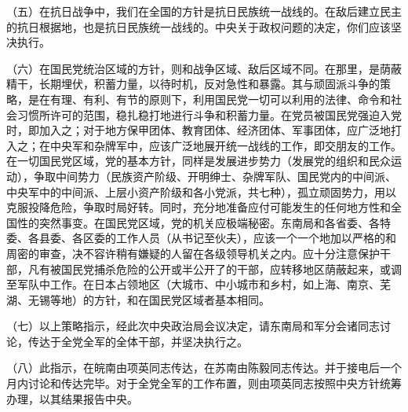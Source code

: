 （五）在抗日战争中，我们在全国的方针是抗日民族统一战线的。在敌后建立民主的抗日根据地，也是抗日民族统一战线的。中央关于政权问题的决定，你们应该坚决执行。

（六）在国民党统治区域的方针，则和战争区域、敌后区域不同。在那里，是荫蔽精干，长期埋伏，积蓄力量，以待时机，反对急性和暴露。其与顽固派斗争的策略，是在有理、有利、有节的原则下，利用国民党一切可以利用的法律、命令和社会习惯所许可的范围，稳扎稳打地进行斗争和积蓄力量。在党员被国民党强迫入党时，即加入之；对于地方保甲团体、教育团体、经济团体、军事团体，应广泛地打入之；在中央军和杂牌军中，应该广泛地展开统一战线的工作，即交朋友的工作。在一切国民党区域，党的基本方针，同样是发展进步势力（发展党的组织和民众运动），争取中间势力（民族资产阶级、开明绅士、杂牌军队、国民党内的中间派、中央军中的中间派、上层小资产阶级和各小党派，共七种），孤立顽固势力，用以克服投降危险，争取时局好转。同时，充分地准备应付可能发生的任何地方性和全国性的突然事变。在国民党区域，党的机关应极端秘密。东南局和各省委、各特委、各县委、各区委的工作人员（从书记至伙夫），应该一个一个地加以严格的和周密的审查，决不容许稍有嫌疑的人留在各级领导机关之内。应十分注意保护干部，凡有被国民党捕杀危险的公开或半公开了的干部，应转移地区荫蔽起来，或调至军队中工作。在日本占领地区（大城市、中小城市和乡村，如上海、南京、芜湖、无锡等地）的方针，和在国民党区域者基本相同。

（七）以上策略指示，经此次中央政治局会议决定，请东南局和军分会诸同志讨论，传达于全党全军的全体干部，并坚决执行之。

（八）此指示，在皖南由项英同志传达，在苏南由陈毅同志传达。并于接电后一个月内讨论和传达完毕。对于全党全军的工作布置，则由项英同志按照中央方针统筹办理，以其结果报告中央。


